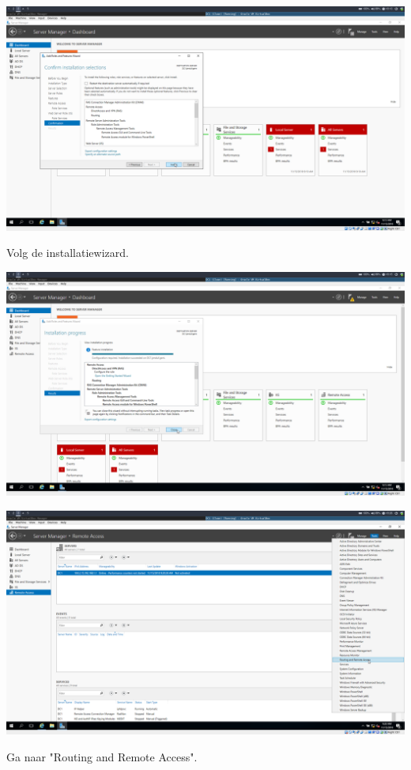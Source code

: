 \documentclass[a4paper]{article}
\begin{document}
\begin{center}
	\includegraphics[width=15cm]{Pictures/DC1/Routing/1542302012.png}
	
	Volg de installatiewizard.
\end{center}
\begin{center}
	\includegraphics[width=15cm]{Pictures/DC1/Routing/1542302154.png}
\end{center}
\begin{center}
	\includegraphics[width=15cm]{Pictures/DC1/Routing/1542302809.png}
	
	Ga naar "Routing and Remote Access".
\end{center}
\end{document}
